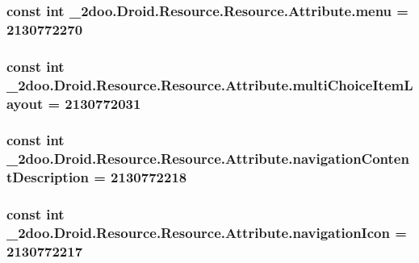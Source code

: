 \hypertarget{class__2doo_1_1_droid_1_1_resource_1_1_attribute_23a27636bba3e0ec4cf84d2d36ca5ebd}{
\subsubsection[{menu}]{\setlength{\rightskip}{0pt plus 5cm}const int \_\-2doo.Droid.Resource.Resource.Attribute.menu = 2130772270}}
\label{class__2doo_1_1_droid_1_1_resource_1_1_attribute_23a27636bba3e0ec4cf84d2d36ca5ebd}


\hypertarget{class__2doo_1_1_droid_1_1_resource_1_1_attribute_60b910ff947fe47f253ef3f7672d14b4}{
\subsubsection[{multiChoiceItemLayout}]{\setlength{\rightskip}{0pt plus 5cm}const int \_\-2doo.Droid.Resource.Resource.Attribute.multiChoiceItemLayout = 2130772031}}
\label{class__2doo_1_1_droid_1_1_resource_1_1_attribute_60b910ff947fe47f253ef3f7672d14b4}


\hypertarget{class__2doo_1_1_droid_1_1_resource_1_1_attribute_cd34015af816ca708edb975d4b12d50f}{
\subsubsection[{navigationContentDescription}]{\setlength{\rightskip}{0pt plus 5cm}const int \_\-2doo.Droid.Resource.Resource.Attribute.navigationContentDescription = 2130772218}}
\label{class__2doo_1_1_droid_1_1_resource_1_1_attribute_cd34015af816ca708edb975d4b12d50f}


\hypertarget{class__2doo_1_1_droid_1_1_resource_1_1_attribute_6d1b19ce516a1649bd4b34343e67021c}{
\subsubsection[{navigationIcon}]{\setlength{\rightskip}{0pt plus 5cm}const int \_\-2doo.Droid.Resource.Resource.Attribute.navigationIcon = 2130772217}}
\label{class__2doo_1_1_droid_1_1_resource_1_1_attribute_6d1b19ce516a1649bd4b34343e67021c}


